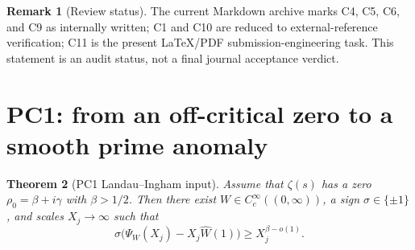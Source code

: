 \documentclass[11pt]{article}
\newtheorem{theorem}{Theorem}[section]
\theoremstyle{definition}
\newtheorem{remark}[theorem]{Remark}
\begin{document}
\begin{remark}[Review status]
The current Markdown archive marks C4, C5, C6, and C9 as internally written; C1 and C10 are reduced to external-reference verification; C11 is the present LaTeX/PDF submission-engineering task.  This statement is an audit status, not a final journal acceptance verdict.
\end{remark}

\section{PC1: from an off-critical zero to a smooth prime anomaly}\label{sec:pc1}
\begin{theorem}[PC1 Landau--Ingham input]\label{thm:pc1}
Assume that $\zeta(s)$ has a zero $\rho_0=\beta+i\gamma$ with $\beta>1/2$.  Then there exist $W\in C_c^\infty((0,\infty))$, a sign $\sigma\in\{\pm1\}$, and scales $X_j\to\infty$ such that
\[
  \sigma\bigl(\Psi_W(X_j)-X_j\widehat W(1)\bigr)\ge X_j^{\beta-o(1)}.
\]
\end{theorem}
\end{document}
